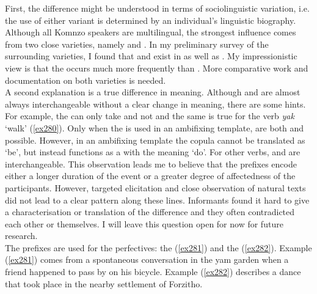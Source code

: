 First, the difference might be understood in terms of sociolinguistic variation, i.e. the use of either variant is determined by an individual's linguistic biography. Although all Komnzo speakers are multilingual, the strongest influence comes from two close varieties, namely  and . In my preliminary survey of the surrounding varieties, I found that \Betaone{} and \Betatwo{} exist in  as well as . My impressionistic view is that the \Betatwo{}  occurs much more frequently than \Betaone. More comparative work and documentation on both varieties is needed.\\

A second explanation is a true difference in meaning. Although \Betaone{} and \Betatwo{} are almost always interchangeable without a clear change in meaning, there are some hints. For example, the  can only take \Betatwo{} and not \Betaone{} and the same is true for the verb \emph{yak} `walk' (\ref{ex280}). Only when the  is used in an ambifixing template, are both \Betaone{} and \Betatwo{} possible. However, in an ambifixing template the copula cannot be translated as `be', but instead functions as a  with the meaning `do'. For other verbs, \Betaone{} and \Betatwo{} are interchangeable. This observation leads me to believe that the \Betatwo{} prefixes encode either a longer duration of the event or a greater degree of affectedness of the participants. However, targeted elicitation and close observation of natural texts did not lead to a clear pattern along these lines. Informants found it hard to give a characterisation or translation of the difference and they often contradicted each other or themselves. I will leave this question open for now for future research.\\

The \Gam{} prefixes are used for the perfectives: the   (\ref{ex281}) and the   (\ref{ex282}). Example (\ref{ex281}) comes from a spontaneous conversation in the yam garden when a friend happened to pass by on his bicycle. Example (\ref{ex282}) describes a dance that took place in the nearby settlement of Forzitho.

